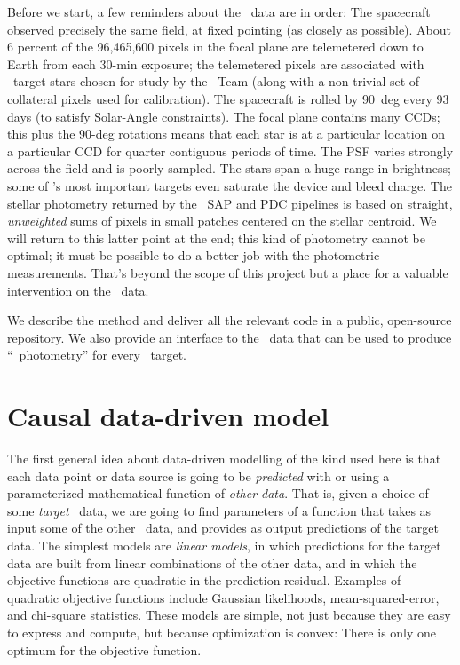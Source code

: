 Before we start, a few reminders about the \Kepler\ data are in order:
The spacecraft observed precisely the same field, at fixed pointing (as closely as possible).
About 6 percent of the 96,465,600 pixels in the focal plane are telemetered down
  to Earth from each 30-min exposure;
  the telemetered pixels are associated with \Kepler\ target stars chosen for study by the \Kepler\ Team (along with a non-trivial set of collateral pixels used for calibration).
The spacecraft is rolled by 90~deg every 93 days (to satisfy Solar-Angle constraints).
The focal plane contains many CCDs;
  this plus the 90-deg rotations means that each star is at a particular location
  on a particular CCD for quarter contiguous periods of time.
The PSF varies strongly across the field and is poorly sampled.
The stars span a huge range in brightness;
  some of \Kepler's most important targets even saturate the device and bleed charge.
The stellar photometry returned by the \Kepler\ SAP and PDC pipelines is based on
  straight, \emph{unweighted} sums of pixels in small patches centered on the stellar centroid.
We will return to this latter point at the end;
  this kind of photometry cannot be optimal;
  it must be possible to do a better job with the photometric measurements.
That's beyond the scope of this project but a place for a valuable intervention on the \Kepler\ data.

We describe the method and deliver all the relevant code in a public, open-source repository.
We also provide an interface to the \Kepler\ data that can be used to produce ``\name\ photometry'' for every \Kepler\ target.

\section{Causal data-driven model}

The first general idea about data-driven modelling of the kind used here
  is that each data point or data source is going to be 
  \emph{predicted} with or using a parameterized mathematical function of \emph{other data}.
That is, given a choice of some \emph{target} \Kepler\ data,
  we are going to find parameters of a function that takes as input some of the other \Kepler\ data,
  and provides as output predictions of the target data.
The simplest models are \emph{linear models},
  in which predictions for the target data are built from linear combinations of the other data,
  and in which the objective functions are quadratic in the prediction residual.
Examples of quadratic objective functions include Gaussian likelihoods, mean-squared-error, and chi-square statistics.
These models are simple,
  not just because they are easy to express and compute,
  but because optimization is convex:
There is only one optimum for the objective function.

